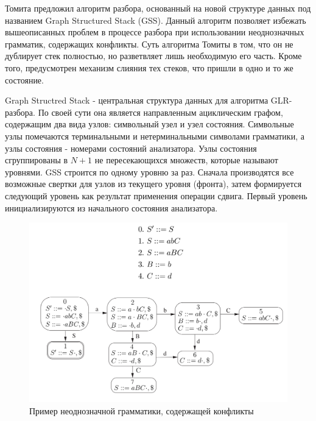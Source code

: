 Томита предложил алгоритм разбора, основанный на новой структуре данных под названием Graph Structured Stack (GSS). Данный алгоритм позволяет избежать вышеописанных проблем в процессе разбора при использовании неоднозначных грамматик, содержащих конфликты. Суть алгоритма Томиты в том, что он не дублирует стек полностью, но разветвляет лишь необходимую его часть. Кроме того, предусмотрен механизм слияния тех стеков, что пришли в одно и то же состояние.

Graph Structred Stack - центральная структура данных для алгоритма GLR-разбора. По своей сути она является направленным ациклическим графом, содержащим два вида узлов: символьный узел и узел состояния. Символьные узлы помечаются терминальными и нетерминальными символами грамматики, а узлы состояния - номерами состояний анализатора. Узлы состояния сгруппированы в $N + 1$ не пересекающихся множеств, которые называют уровнями. GSS строится по одному уровню за раз. Сначала производятся все возможные свертки для узлов из текущего уровня (фронта), затем формируется следующий уровень как результат применения операции сдвига. Первый уровень инициализируются из начального состояния анализатора.

\begin{figure}%
\centering
\includegraphics[width=\textwidth]{img/glr-sample-grammar.png}
\caption{Пример неоднозначной грамматики, содержащей конфликты}
\label{fig:AmbigiousGrammar}
\end{figure}


